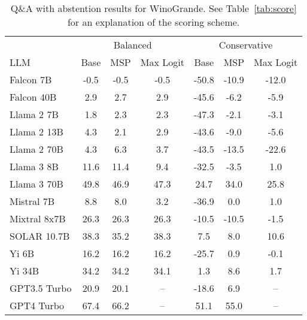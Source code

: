 \begin{table*}[h]
\centering
\caption{Q\&A with abstention results for WinoGrande. See Table~\ref{tab:score} for an explanation of the scoring scheme.}
\label{tab:winogrande_score}
\begin{tabular}{lcccccc}
\toprule
& \multicolumn{3}{c}{Balanced} & \multicolumn{3}{c}{Conservative} \\ 
LLM & Base & MSP & Max Logit & Base & MSP & Max Logit \\ 
\cmidrule(lr){1-1}\cmidrule(lr){2-4}\cmidrule(lr){5-7} 
Falcon 7B & -0.5 & -0.5 & -0.5 & -50.8 & -10.9 & -12.0\\
Falcon 40B & 2.9 & 2.7 & 2.9 & -45.6 & -6.2 & -5.9\\
Llama 2 7B & 1.8 & 2.3 & 2.3 & -47.3 & -2.1 & -3.1\\
Llama 2 13B & 4.3 & 2.1 & 2.9 & -43.6 & -9.0 & -5.6\\
Llama 2 70B & 4.3 & 6.3 & 3.7 & -43.5 & -13.5 & -22.6\\
Llama 3 8B & 11.6 & 11.4 & 9.4 & -32.5 & -3.5 & 1.0\\
Llama 3 70B & 49.8 & 46.9 & 47.3 & 24.7 & 34.0 & 25.8\\
Mistral 7B & 8.8 & 8.0 & 3.2 & -36.9 & 0.0 & 1.0\\
Mixtral 8x7B & 26.3 & 26.3 & 26.3 & -10.5 & -10.5 & -1.5\\
SOLAR 10.7B & 38.3 & 35.2 & 38.3 & 7.5 & 8.0 & 10.6\\
Yi 6B & 16.2 & 16.2 & 16.2 & -25.7 & 0.9 & -0.1\\
Yi 34B & 34.2 & 34.2 & 34.1 & 1.3 & 8.6 & 1.7\\
GPT3.5 Turbo & 20.9 & 20.1 & -- & -18.6 & 6.9 & --\\
GPT4 Turbo & 67.4 & 66.2 & -- & 51.1 & 55.0 & --\\
\bottomrule
\end{tabular}
\end{table*}
